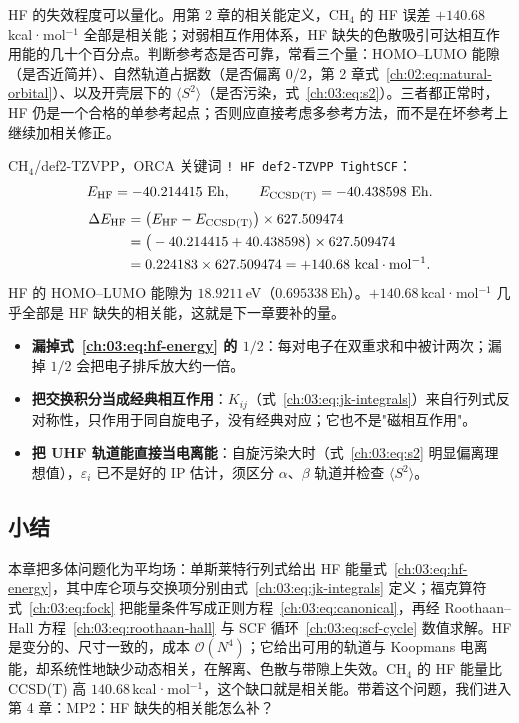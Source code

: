 HF 的失效程度可以量化。用第 2 章的相关能定义，CH$_4$ 的 HF 误差 $+140.68$\,kcal·mol$^{-1}$ 全部是相关能；对弱相互作用体系，HF 缺失的色散吸引可达相互作用能的几十个百分点。判断参考态是否可靠，常看三个量：HOMO--LUMO 能隙（是否近简并）、自然轨道占据数（是否偏离 0/2，第 2 章式~\eqref{ch:02:eq:natural-orbital}）、以及开壳层下的 $\langle S^2\rangle$（是否污染，式~\eqref{ch:03:eq:s2}）。三者都正常时，HF 仍是一个合格的单参考起点；否则应直接考虑多参考方法，而不是在坏参考上继续加相关修正。

\begin{ch4box}
CH$_4$/def2-TZVPP，ORCA 关键词 \texttt{! HF def2-TZVPP TightSCF}：
\[
E_{\mathrm{HF}} = -40.214415\ \mathrm{Eh},
\qquad
E_{\mathrm{CCSD(T)}} = -40.438598\ \mathrm{Eh}.
\]
\begin{align*}
\Delta E_{\mathrm{HF}}
&= \big(E_{\mathrm{HF}} - E_{\mathrm{CCSD(T)}}\big)\times 627.509474 \\
&= \big(-40.214415 + 40.438598\big)\times 627.509474 \\
&= 0.224183\times 627.509474
= +140.68\ \mathrm{kcal\cdot mol^{-1}}.
\end{align*}
HF 的 HOMO--LUMO 能隙为 $18.9211$\,eV（$0.695338$\,Eh）。$+140.68$\,kcal·mol$^{-1}$ 几乎全部是 HF 缺失的相关能，这就是下一章要补的量。
\end{ch4box}

\begin{pitfall}
\begin{itemize}
  \item \textbf{漏掉式~\eqref{ch:03:eq:hf-energy} 的 $1/2$}：每对电子在双重求和中被计两次；漏掉 $1/2$ 会把电子排斥放大约一倍。
  \item \textbf{把交换积分当成经典相互作用}：$K_{ij}$（式~\eqref{ch:03:eq:jk-integrals}）来自行列式反对称性，只作用于同自旋电子，没有经典对应；它也不是"磁相互作用"。
  \item \textbf{把 UHF 轨道能直接当电离能}：自旋污染大时（式~\eqref{ch:03:eq:s2} 明显偏离理想值），$\varepsilon_i$ 已不是好的 IP 估计，须区分 $\alpha$、$\beta$ 轨道并检查 $\langle S^2\rangle$。
\end{itemize}
\end{pitfall}

\subsection*{小结}
本章把多体问题化为平均场：单斯莱特行列式给出 HF 能量式~\eqref{ch:03:eq:hf-energy}，其中库仑项与交换项分别由式~\eqref{ch:03:eq:jk-integrals} 定义；福克算符式~\eqref{ch:03:eq:fock} 把能量条件写成正则方程~\eqref{ch:03:eq:canonical}，再经 Roothaan--Hall 方程~\eqref{ch:03:eq:roothaan-hall} 与 SCF 循环~\eqref{ch:03:eq:scf-cycle} 数值求解。HF 是变分的、尺寸一致的，成本 $\mathcal{O}(N^4)$；它给出可用的轨道与 Koopmans 电离能，却系统性地缺少动态相关，在解离、色散与带隙上失效。CH$_4$ 的 HF 能量比 CCSD(T) 高 $140.68$\,kcal·mol$^{-1}$，这个缺口就是相关能。带着这个问题，我们进入第 4 章：MP2：HF 缺失的相关能怎么补？
